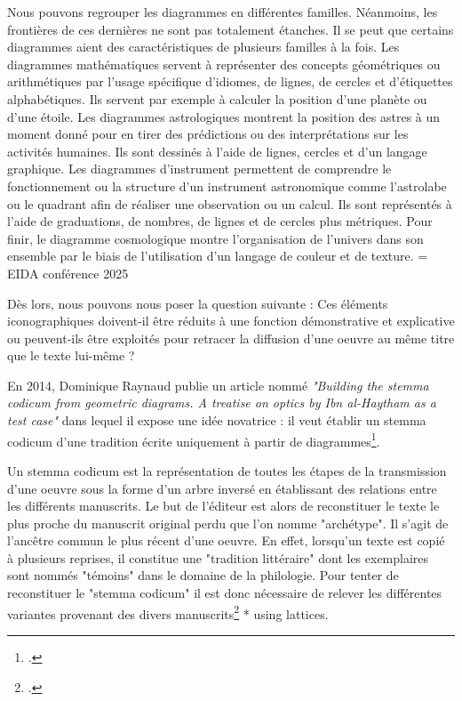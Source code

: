 \documentclass[a4paper,12pt,twoside]{book}
\begin{document}
	
	Nous pouvons regrouper les diagrammes en différentes familles. Néanmoins, les frontières de ces dernières ne sont pas totalement étanches. Il se peut que certains diagrammes aient des caractéristiques de plusieurs familles à la fois. Les diagrammes mathématiques servent à représenter des concepts géométriques ou arithmétiques par l'usage spécifique d'idiomes, de lignes, de cercles et d'étiquettes alphabétiques. Ils servent par exemple à calculer la position d'une planète ou d'une étoile. Les diagrammes astrologiques montrent la position des astres à un moment donné pour en tirer des prédictions ou des interprétations sur les activités humaines. Ils sont dessinés à l'aide de lignes, cercles et d'un langage graphique. Les diagrammes d'instrument permettent de comprendre le fonctionnement ou la structure d'un instrument astronomique comme l'astrolabe ou le quadrant afin de réaliser une observation ou un calcul. Ils sont représentés à l'aide de graduations, de nombres, de lignes et de cercles plus métriques. Pour finir, le diagramme cosmologique montre l'organisation de l'univers dans son ensemble par le biais de l'utilisation d'un langage de couleur et de texture. = EIDA conférence 2025
	
	
	
	Dès lors, nous pouvons nous poser la question suivante : Ces éléments iconographiques doivent-il être réduits à une fonction démonstrative et explicative ou peuvent-ils être exploités pour retracer la diffusion d'une oeuvre au même titre que le texte lui-même ?
	
	En 2014, Dominique Raynaud publie un article nommé \textit{"Building the stemma codicum from geometric diagrams. A treatise on optics by Ibn al-Haytham as a test case"} dans lequel il expose une idée novatrice : il veut établir un stemma codicum d'une tradition écrite uniquement à partir de diagrammes\footcite{raynaudBuildingStemmaCodicum2014}.
	
	Un stemma codicum est la représentation de toutes les étapes de la transmission d'une oeuvre sous la forme d'un arbre inversé en établissant des relations entre les différents manuscrits. Le but de l'éditeur est alors de reconstituer le texte le plus proche du manuscrit original perdu que l'on nomme "archétype". Il s'agit de l'ancêtre commun le plus récent d'une oeuvre. En effet, lorsqu'un texte est copié à plusieurs reprises, il constitue une "tradition littéraire" dont les exemplaires sont nommés "témoins" dans le domaine de la philologie. Pour tenter de reconstituer le "stemma codicum" il est donc nécessaire de relever les différentes variantes provenant des divers manuscrits\footcite{pouliquenUsingLatticesReconstructing} * using lattices.
	
\end{document}
